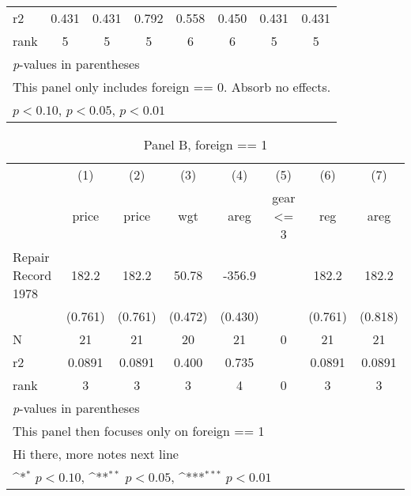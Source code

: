\begin{table}[htbp]
\begin{tabular}{l*{7}{c}}
r2                  &       0.431         &       0.431         &       0.792         &       0.558         &       0.450         &       0.431         &       0.431         \\
rank                &           5         &           5         &           5         &           6         &           6         &           5         &           5         \\
\bottomrule
\multicolumn{8}{l}{\footnotesize \textit{p}-values in parentheses}\\
\multicolumn{8}{l}{\footnotesize This panel only includes foreign == 0. Absorb no effects.}\\
\multicolumn{8}{l}{\footnotesize \sym{*} \(p<0.10\), \sym{**} \(p<0.05\), \sym{***} \(p<0.01\)}\\
\end{tabular}
\end{table}
\begin{table}[htbp]\centering
\def\sym#1{\ifmmode^{#1}\else\(^{#1}\)\fi}
\caption{Panel B, foreign == 1}
\begin{tabular}{l*{7}{c}}
\toprule
                    &\multicolumn{1}{c}{(1)}&\multicolumn{1}{c}{(2)}&\multicolumn{1}{c}{(3)}&\multicolumn{1}{c}{(4)}&\multicolumn{1}{c}{(5)}&\multicolumn{1}{c}{(6)}&\multicolumn{1}{c}{(7)}\\
                    &\multicolumn{1}{c}{price}&\multicolumn{1}{c}{price}&\multicolumn{1}{c}{wgt}&\multicolumn{1}{c}{areg}&\multicolumn{1}{c}{gear <= 3}&\multicolumn{1}{c}{reg}&\multicolumn{1}{c}{areg}\\
\midrule
Repair Record 1978  &       182.2         &       182.2         &       50.78         &      -356.9         &                     &       182.2         &       182.2         \\
                    &     (0.761)         &     (0.761)         &     (0.472)         &     (0.430)         &                     &     (0.761)         &     (0.818)         \\
\midrule
N                   &          21         &          21         &          20         &          21         &           0         &          21         &          21         \\
r2                  &      0.0891         &      0.0891         &       0.400         &       0.735         &                     &      0.0891         &      0.0891         \\
rank                &           3         &           3         &           3         &           4         &           0         &           3         &           3         \\
\bottomrule
\multicolumn{8}{l}{\footnotesize \textit{p}-values in parentheses}\\
\multicolumn{8}{l}{\footnotesize This panel then focuses only on foreign == 1}\\
\multicolumn{8}{l}{\footnotesize Hi there, more notes next line}\\
\multicolumn{8}{l}{\footnotesize \sym{*} \(p<0.10\), \sym{**} \(p<0.05\), \sym{***} \(p<0.01\)}\\
\end{tabular}
\end{table}
